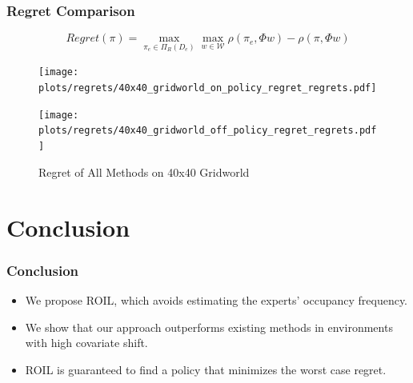 \documentclass{beamer}
\begin{document}
\begin{frame}
\frametitle{Regret Comparison}

 \[ Regret(\pi) = \max_{\pi_e \in \Pi_R(D_e)} \max_{w \in \mathcal{W}} \rho(\pi_e, \Phi w) - \rho(\pi, \Phi w)\]

\begin{figure}
  \begin{center}
  \begin{minipage}{0.45\linewidth}
    \centering
    \texttt{[image: plots/regrets/40x40\_gridworld\_on\_policy\_regret\_regrets.pdf]}
  \end{minipage}
  \hspace{0.05\linewidth}
  \begin{minipage}{0.45\linewidth}
    \centering
    \texttt{[image: plots/regrets/40x40\_gridworld\_off\_policy\_regret\_regrets.pdf]}
  \end{minipage}
  \end{center}
\caption{Regret of All Methods on 40x40 Gridworld}
\end{figure}

\end{frame}

\section*{Conclusion}

\begin{frame}
	\frametitle{Conclusion}
	\begin{itemize}
		\item We propose ROIL, which avoids estimating the experts' occupancy frequency.
		\item We show that our approach outperforms existing methods in environments with high covariate shift.
		\item ROIL is guaranteed to find a policy that minimizes the worst case regret.
	\end{itemize}
\end{frame}
\end{document}
